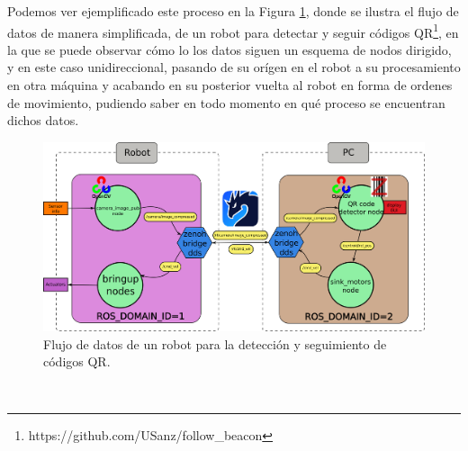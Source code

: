 Podemos ver ejemplificado este proceso en la Figura \ref{fig:data_flow}, donde
se ilustra el flujo de datos de manera simplificada, de un robot para detectar y
seguir códigos QR\footnote{https://github.com/USanz/follow_beacon}, en la que se
puede observar cómo lo los datos siguen un esquema de nodos dirigido, y en este
caso unidireccional, pasando de su orígen en el robot a su procesamiento en otra
máquina y acabando en su posterior vuelta al robot en forma de ordenes de
movimiento, pudiendo saber en todo momento en qué proceso se encuentran dichos
datos.

\begin{figure} [h!]
  \begin{center}
    \includegraphics[width=15cm]{figs/QR_code_data_flow}
  \end{center}
  \caption{Flujo de datos de un robot para la detección y seguimiento de códigos QR.}
  \label{fig:data_flow}
\end{figure}\













